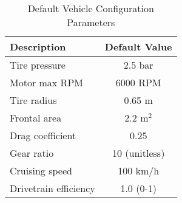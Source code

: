 \documentclass{article}
\begin{document}
\begin{table}[h!]
    \centering
    \begin{tabular}{lc}
        \toprule
        \textbf{Description} & \textbf{Default Value} \\
        \midrule
        Tire pressure & 2.5 bar \\
        Motor max RPM & 6000 RPM \\
        Tire radius & 0.65 m \\
        Frontal area & 2.2 m$^2$ \\
        Drag coefficient & 0.25 \\
        Gear ratio & 10 (unitless) \\
        Cruising speed & 100 km/h \\
        Drivetrain efficiency & 1.0 (0-1) \\
        \bottomrule
    \end{tabular}
    \caption{Default Vehicle Configuration Parameters}
    \label{tab:vehicle_config}
\end{table}



\end{document}
